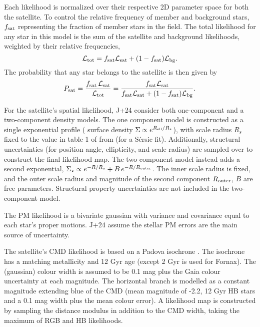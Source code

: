 Each likelihood is normalized over their respective 2D parameter space
for both the satellite. To control the relative frequency of member and
background stars, \(f_{\rm sat}\) representing the fraction of member
stars in the field. The total likelihood for any star in this model is
the sum of the satellite and background likelihoods, weighted by their
relative frequencies, \begin{equation}{
{\cal L}_{\rm tot} = f_{\rm sat}{\cal L}_{\rm sat} + (1-f_{\rm sat}){\cal L}_{\rm bg}.
}\end{equation} The probability that any star belongs to the satellite
is then given by \begin{equation}{
P_{\rm sat} = 
\frac{f_{\rm sat}\,{\cal L}_{\rm sat}}{{\cal L}_{\rm tot}}
= \frac{f_{\rm sat}{\cal L}_{\rm sat}}{f_{\rm sat}{\cal L}_{\rm sat} + (1-f_{\rm sat}){\cal L}_{\rm bg}}.
}\end{equation}

For the satellite's spatial likelihood, J+24 consider both one-component
and a two-component density models. The one component model is
constructed as a single exponential profile ( surface density
\(\Sigma \propto e^{R_{\rm ell} / R_s}\)), with scale radius \(R_s\)
fixed to the value in table 1 of \citet{MV2020a} from \citet{munoz+2018}
(for a Sérsic fit). Additionally, structural uncertainties (for position
angle, ellipticity, and scale radius) are sampled over to construct the
final likelihood map. The two-component model instead adds a second
exponential,
\(\Sigma_\star \propto e^{-R/R_s} + B\,e^{-R/R_{\rm outer}}\). The inner
scale radius is fixed, and the outer scale radius and magnitude of the
second component \(R_{\rm outer}\), \(B\) are free parameters.
Structural property uncertainties are not included in the two-component
model.

The PM likelihood is a bivariate gaussian with variance and covariance
equal to each star's proper motions. J+24 assume the stellar PM errors
are the main source of uncertainty.

The satellite's CMD likelihood is based on a Padova isochrone
\citep{girardi+2002}. The isochrone has a matching metallicity and 12
Gyr age (except 2 Gyr is used for Fornax). The (gaussian) colour width
is assumed to be 0.1 mag plus the Gaia colour uncertainty at each
magnitude. The horizontal branch is modelled as a constant magnitude
extending blue of the CMD (mean magnitude of -2.2, 12 Gyr HB stars and a
0.1 mag width plus the mean colour error). A likelihood map is
constructed by sampling the distance modulus in addition to the CMD
width, taking the maximum of RGB and HB likelihoods.

